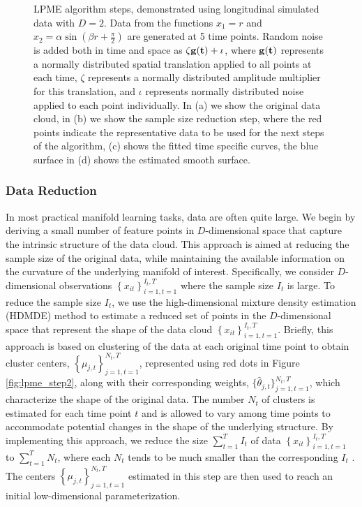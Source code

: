 \documentclass[12pt]{article}
\theoremstyle{definition}
\begin{document}
\begin{figure}
  \caption{{\footnotesize LPME algorithm steps, demonstrated using longitudinal simulated data with $D=2$. Data from the functions $x_1 = r$ and $x_2 = \alpha \sin \left(\beta r + \frac{\pi}{2}\right)$ are generated at 5 time points. Random noise is added both in time and space as $\zeta \bf{g}(t) + \iota$, where $\bf{g}(t)$ represents a normally distributed spatial translation applied to all points at each time, $\zeta$ represents a normally distributed amplitude multiplier for this translation, and $\iota$ represents normally distributed noise applied to each point individually. In (a) we show the original data cloud, in (b) we show the sample size reduction step, where the red points indicate the representative data to be used for the next steps of the algorithm, (c) shows the fitted time specific curves, the blue surface in (d) shows the estimated smooth surface.} }
  \label{fig:lpme_steps}
\end{figure}


\subsubsection{Data Reduction}

In most practical manifold learning tasks, data are often quite large. We begin by deriving a small number of feature points in $D$-dimensional space that capture the intrinsic structure of the data cloud. This approach is aimed at reducing the sample size of the original data, while maintaining the available information on the curvature of the underlying manifold of interest. Specifically, we consider $D$-dimensional observations $\left\{x_{it}\right\}_{i=1, t=1}^{I_t, T}$ where the sample size $I_t$ is large. To reduce the sample size $I_t$, we use the high-dimensional mixture density estimation (HDMDE) method \citep[see][alg. 1]{mengPrincipalManifoldEstimation2021} to estimate a reduced set of points in the $D$-dimensional space that represent the shape of the data cloud $\left\{x_{it}\right\}_{i=1, t=1}^{I_t, T}$. Briefly, this approach is based on clustering of the data at each original time point to obtain cluster centers, $\left\{\mu_{j, t}\right\}_{j=1, t=1}^{N_t, T}$, represented using red dots in Figure \ref{fig:lpme_step2}, along with their corresponding weights, $\{\hat{\theta}_{j, t}\}_{j=1, t=1}^{N_t, T}$, which characterize the shape of the original data. The number $N_t$ of clusters is estimated for each time point $t$ and is allowed to vary among time points to accommodate potential changes in the shape of the underlying structure. By implementing this approach, we reduce the size $\sum_{t=1}^T I_t$ of data $\left\{x_{it}\right\}_{i=1, t=1}^{I_t, T}$ to $\sum_{t=1}^T N_t$, where each $N_t$ tends to be much smaller than the corresponding $I_t$ \citep[see the simulation study presented in][fig. 3(c)]{mengPrincipalManifoldEstimation2021}. The centers $\left\{\mu_{j, t}\right\}_{j=1, t=1}^{N_t, T}$ estimated in this step are then used to reach an initial low-dimensional parameterization.
\end{document}
